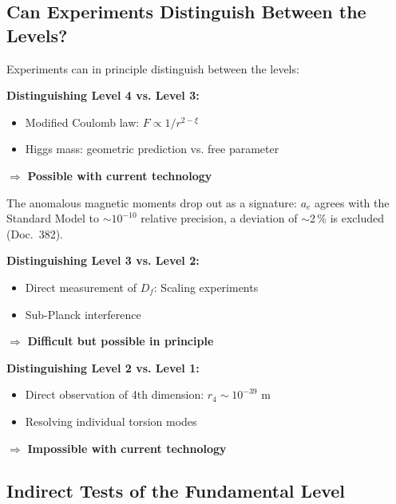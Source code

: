 	\subsection{Can Experiments Distinguish Between the Levels?}
	
	\begin{important}
		Experiments can in principle distinguish between the levels:
		
		\vspace{0.3cm}
		
		\textbf{Distinguishing Level 4 vs. Level 3:}
		\begin{itemize}
			\item Modified Coulomb law: $F \propto 1/r^{2-\xi}$
			\item Higgs mass: geometric prediction vs. free parameter
		\end{itemize}
		
		$\Rightarrow$ \textbf{Possible with current technology}

		The anomalous magnetic moments drop out as a signature: $a_e$ agrees with the Standard Model to $\sim10^{-10}$ relative precision, a deviation of $\sim$2\,\% is excluded (Doc.~382).
		
		\vspace{0.3cm}
		
		\textbf{Distinguishing Level 3 vs. Level 2:}
		\begin{itemize}
			\item Direct measurement of $D_f$: Scaling experiments
			\item Sub-Planck interference
		\end{itemize}
		
		$\Rightarrow$ \textbf{Difficult but possible in principle}
		
		\vspace{0.3cm}
		
		\textbf{Distinguishing Level 2 vs. Level 1:}
		\begin{itemize}
			\item Direct observation of 4th dimension: $r_4 \sim 10^{-39}$ m
			\item Resolving individual torsion modes
		\end{itemize}
		
		$\Rightarrow$ \textbf{Impossible with current technology}
	\end{important}
	
	\subsection{Indirect Tests of the Fundamental Level}
	
